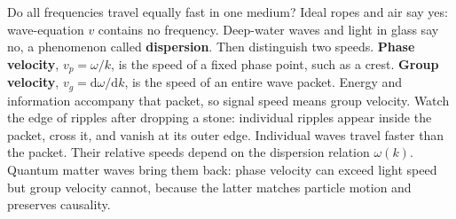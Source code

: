 \begin{challenge}
Do all frequencies travel equally fast in one medium? Ideal ropes and air say yes: wave-equation \(v\) contains no frequency. Deep-water waves and light in glass say no, a phenomenon called \textbf{dispersion}. Then distinguish two speeds. \textbf{Phase velocity}, \(v_p=\omega/k\), is the speed of a fixed phase point, such as a crest. \textbf{Group velocity}, \(v_g=\mathrm{d}\omega/\mathrm{d}k\), is the speed of an entire wave packet. Energy and information accompany that packet, so signal speed means group velocity. Watch the edge of ripples after dropping a stone: individual ripples appear inside the packet, cross it, and vanish at its outer edge. Individual waves travel faster than the packet. Their relative speeds depend on the dispersion relation \(\omega(k)\). Quantum matter waves bring them back: phase velocity can exceed light speed but group velocity cannot, because the latter matches particle motion and preserves causality.
\end{challenge}


